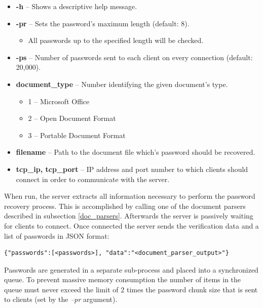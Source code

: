 \documentclass[11pt,oneside]{fithesis2}
\begin{document}
\begin{itemize}
\setlength\itemsep{0.1em}
	\item{\textbf{-h} -- Shows a descriptive help message.}
	\item{\textbf{-pr} -- Sets the password’s maximum length (default: 8).}
		\begin{itemize}
		\setlength\itemsep{0.1em}
			\item{All passwords up to the specified length will be checked.}
		\end{itemize}
	\item{\textbf{-ps} -- Number of passwords sent to each client on every connection (default: 20,000).}
	\item{\textbf{document\_type} -- Number identifying the given document's type.}
		\begin{itemize}
		\setlength\itemsep{0.1em}
			\item{1 -- Microsoft Office}
			\item{2 -- Open Document Format}
			\item{3 -- Portable Document Format}
		\end{itemize}
	\item{\textbf{filename} -- Path to the document file which’s password should be recovered.}
	\item{\textbf{tcp\_ip, tcp\_port} --  IP address and port number to which clients should connect in order to communicate with the server.}
\end{itemize}\label{server_params}

When run, the server extracts all information necessary to perform the password recovery process. This is accomplished by calling one of the document parsers described in subsection \ref{doc_parsers}. Afterwards the server is passively waiting for clients to connect. Once connected the server sends the verification data and a list of passwords in JSON \cite{rfc7159} format:

\begin{lstlisting} 
{"passwords":[<passwords>], "data":"<document_parser_output>"}
\end{lstlisting}\label{server_message}

Passwords are generated in a separate sub-process and placed into a synchronized queue. To prevent massive memory consumption the number of items in the queue must never exceed the limit of 2 times the password chunk size that is sent to clients (set by the \textit{–pr} argument).
\end{document}
